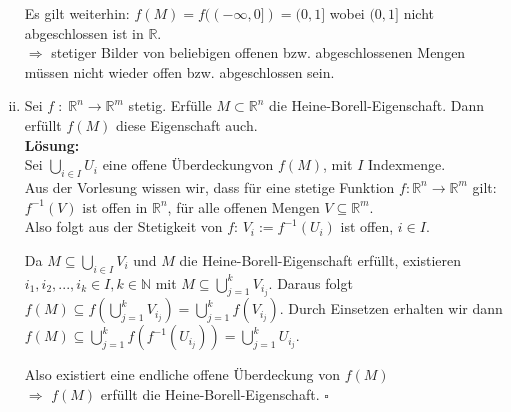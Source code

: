\begin{enumerate}[(i)]
            Es gilt weiterhin: $f(M) = f((-\infty, 0]) = (0,1]$ wobei $(0,1]$ nicht abgeschlossen ist in $\mathbb{R}$.\\

      $\Rightarrow$ stetiger Bilder von beliebigen offenen bzw. abgeschlossenen Mengen 
      müssen nicht wieder offen bzw. abgeschlossen sein.
    \newpage
    \item Sei $ f \; : \; \mathbb{R}^n \rightarrow \mathbb{R}^m$ stetig. Erfülle $M \subset \mathbb{R}^n$
        die Heine-Borell-Eigenschaft. Dann erfüllt $f(M)$ diese Eigenschaft auch.\\
    \textbf{Lösung:}\\
        Sei $\bigcup_{i \in I} U_i$ eine offene Überdeckungvon $f(M)$, mit $I$ Indexmenge. \\
        Aus der Vorlesung wissen wir, dass für eine stetige Funktion 
        $f: \mathbb{R}^n \to \mathbb{R}^m$ gilt: $f^{-1}(V)$ ist offen in $\mathbb{R}^n$,
        für alle offenen Mengen $V \subseteq \mathbb{R}^m$. \\

        Also folgt aus der Stetigkeit von $f$: 
        $V_i := f^{-1}(U_i)$ ist offen, $i \in I$.

        Da $M \subseteq \bigcup_{i \in I}V_i$ und $M$ die Heine-Borell-Eigenschaft erfüllt,
        existieren $i_1, i_2, ..., i_k \in I, k \in \mathbb{N}$ mit
        $M \subseteq \bigcup_{j = 1}^{k} V_{i_j}$.
        Daraus folgt $f(M) \subseteq f(\bigcup_{j = 1}^{k} V_{i_j})
        = \bigcup_{j = 1}^{k} f(V_{i_j})$. Durch Einsetzen erhalten wir dann
        $ f(M) \subseteq \bigcup_{j = 1}^{k} f(f^{-1}(U_{i_j})) = \bigcup_{j = 1}^{k} U_{i_j} $.

        Also existiert eine endliche offene Überdeckung von $f(M)$ \\
        $\Rightarrow$ $f(M)$ erfüllt die Heine-Borell-Eigenschaft.
        \mbox{} \hfill $\square$
\end{enumerate}

